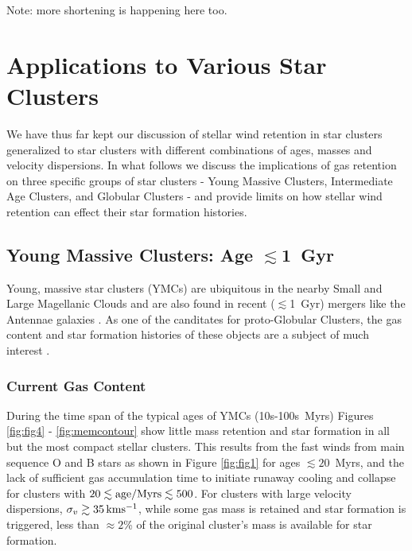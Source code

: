 \documentclass[fleqn,usenatbib]{mnras}
\begin{document}
Note: more shortening is happening here too.

\section{Applications to Various Star Clusters} \label{section:applications}

We have thus far kept our discussion of stellar wind retention in star clusters generalized to star clusters with different combinations of ages, masses and velocity dispersions.  In what follows we discuss the implications of gas retention on three specific groups of star clusters - Young Massive Clusters, Intermediate Age Clusters, and Globular Clusters - and provide limits on how stellar wind retention can effect their star formation histories.


\subsection{Young Massive Clusters: Age $\lesssim$1~Gyr}

Young, massive star clusters (YMCs) are ubiquitous in the nearby Small and Large Magellanic Clouds \citep{goud2014} and are also found in recent ($\lesssim$1~Gyr) mergers like the Antennae galaxies \citep{whitmore2007}.  As one of the canditates for proto-Globular Clusters, the gas content and star formation histories of these objects are a subject of much interest \citep[e.g.][]{zwart2010}.

\subsubsection{Current Gas Content} \label{section:YMCcurrent}

 During the time span of the typical ages of YMCs (10s-100s~Myrs) Figures \ref{fig:fig4} - \ref{fig:memcontour} show little mass retention and star formation in all but the most compact stellar clusters.
 This results from the fast winds from main sequence O and B stars as shown in Figure \ref{fig:fig1} for ages $\lesssim 20$~Myrs, and the lack of sufficient gas accumulation time to initiate runaway cooling and collapse for clusters with $20 \lesssim {\rm age/Myrs} \lesssim 500$.
 For clusters with large velocity dispersions, $\sigma_v \gtrsim 35 \, {\rm km s^{-1}}$, while some gas mass is retained and star formation is triggered, less than $\approx 2$\% of the original cluster's mass is available for star formation.
\end{document}
